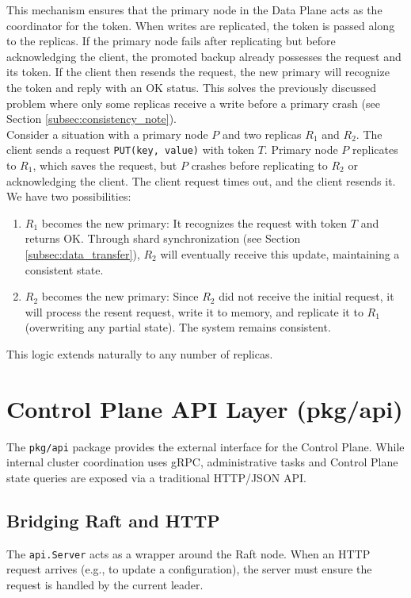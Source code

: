 \documentclass[shortabstract]{iithesis}
\begin{document}
This mechanism ensures that the primary node in the Data Plane acts as the coordinator for the token. When writes are replicated, the token is passed along to the replicas. If the primary node fails after replicating but before acknowledging the client, the promoted backup already possesses the request and its token. If the client then resends the request, the new primary will recognize the token and reply with an OK status. This solves the previously discussed problem where only some replicas receive a write before a primary crash (see Section \ref{subsec:consistency_note}).\\

Consider a situation with a primary node $P$ and two replicas $R_1$ and $R_2$. The client sends a request \texttt{PUT(key, value)} with token $T$. Primary node $P$ replicates to $R_1$, which saves the request, but $P$ crashes before replicating to $R_2$ or acknowledging the client. The client request times out, and the client resends it. We have two possibilities:
\begin{enumerate}
    \item $R_1$ becomes the new primary: It recognizes the request with token $T$ and returns OK. Through shard synchronization (see Section \ref{subsec:data_transfer}), $R_2$ will eventually receive this update, maintaining a consistent state.
    \item $R_2$ becomes the new primary: Since $R_2$ did not receive the initial request, it will process the resent request, write it to memory, and replicate it to $R_1$ (overwriting any partial state). The system remains consistent.
\end{enumerate}
This logic extends naturally to any number of replicas.

\section{Control Plane API Layer (pkg/api)}
The \texttt{pkg/api} package provides the external interface for the Control Plane. While internal cluster coordination uses gRPC, administrative tasks and Control Plane state queries are exposed via a traditional HTTP/JSON API.

\subsection{Bridging Raft and HTTP}
The \texttt{api.Server} acts as a wrapper around the Raft node. When an HTTP request arrives (e.g., to update a configuration), the server must ensure the request is handled by the current leader.
\end{document}
